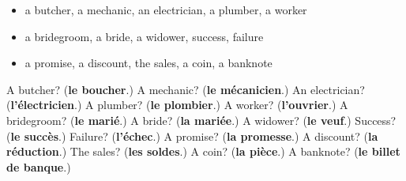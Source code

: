 \begin{itemize}
\raggedright
  \item a butcher, a mechanic, an electrician, a plumber, a worker
  \item a bridegroom, a bride, a widower, success, failure
  \item a promise, a discount, the sales, a coin, a banknote
\end{itemize}

\begin{tcolorbox}[breakable,colback=teal!4,colframe=teal!35!black,title={Before you move on}]
A butcher? (\textbf{le boucher}.) A mechanic? (\textbf{le mécanicien}.) An electrician? (\textbf{l'électricien}.) A plumber? (\textbf{le plombier}.) A worker? (\textbf{l'ouvrier}.) A bridegroom? (\textbf{le marié}.) A bride? (\textbf{la mariée}.) A widower? (\textbf{le veuf}.) Success? (\textbf{le succès}.) Failure? (\textbf{l'échec}.) A promise? (\textbf{la promesse}.) A discount? (\textbf{la réduction}.) The sales? (\textbf{les soldes}.) A coin? (\textbf{la pièce}.) A banknote? (\textbf{le billet de banque}.)
\end{tcolorbox}
